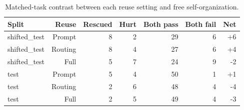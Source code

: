 \begin{table}[t]
\centering
\small
\begin{tabular}{lrrrrrr}
\toprule
Split & Reuse & Rescued & Hurt & Both pass & Both fail & Net \\
\midrule
shifted\_test & Prompt & 8 & 2 & 29 & 6 & +6 \\
shifted\_test & Routing & 8 & 4 & 27 & 6 & +4 \\
shifted\_test & Full & 5 & 7 & 24 & 9 & -2 \\
test & Prompt & 5 & 4 & 50 & 1 & +1 \\
test & Routing & 2 & 6 & 48 & 4 & -4 \\
test & Full & 2 & 5 & 49 & 4 & -3 \\
\bottomrule
\end{tabular}
\caption{Matched-task contrast between each reuse setting and free self-organization.}
\label{tab:apps-contrast}
\end{table}

